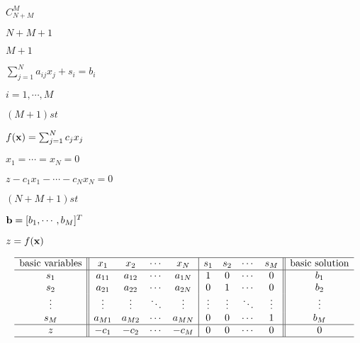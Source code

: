 \documentclass{article}
\def\lthtmlcheckvsize{\ifdim\ht\sizebox<\vsize 
  \ifdim\wd\sizebox<\hsize\expandafter\hfill\fi \expandafter\vfill
  \else\expandafter\vss\fi}%
\begin{document}
{\newpage\clearpage
{}%
$ C_{N+M}^M$%
\lthtmlindisplaymathZ
\lthtmlcheckvsize\clearpage}

{\newpage\clearpage
{}%
$ N+M+1$%
\lthtmlindisplaymathZ
\lthtmlcheckvsize\clearpage}

{\newpage\clearpage
{}%
$ M+1$%
\lthtmlindisplaymathZ
\lthtmlcheckvsize\clearpage}

{\newpage\clearpage
{}%
$ \sum_{j=1}^N a_{ij}x_j+s_i=b_i$%
\lthtmlindisplaymathZ
\lthtmlcheckvsize\clearpage}

{\newpage\clearpage
{}%
$ i=1,\cdots,M$%
\lthtmlindisplaymathZ
\lthtmlcheckvsize\clearpage}

{\newpage\clearpage
{}%
$ (M+1)st$%
\lthtmlindisplaymathZ
\lthtmlcheckvsize\clearpage}

{\newpage\clearpage
{}%
$ f({\bf x})=\sum_{j=1}^N c_jx_j$%
\lthtmlindisplaymathZ
\lthtmlcheckvsize\clearpage}

{\newpage\clearpage
{}%
$ x_1=\cdots=x_N=0$%
\lthtmlindisplaymathZ
\lthtmlcheckvsize\clearpage}

{\newpage\clearpage
{}%
$ z-c_1x_1-\cdots-c_Nx_N=0$%
\lthtmlindisplaymathZ
\lthtmlcheckvsize\clearpage}

{\newpage\clearpage
{}%
$ (N+M+1)st$%
\lthtmlindisplaymathZ
\lthtmlcheckvsize\clearpage}

{\newpage\clearpage
{}%
$ {\bf b}=[b_1,\cdots,b_M]^T$%
\lthtmlindisplaymathZ
\lthtmlcheckvsize\clearpage}

{\newpage\clearpage
{}%
$ z=f({\bf x})$%
\lthtmlindisplaymathZ
\lthtmlcheckvsize\clearpage}

{\newpage\clearpage
{}%
\begin{displaymath}\begin{array}{c||cccc|cccc||c}\hline
\mbox{basic variables} & x_1   & x_2   & \cdots &  x_N   & s_1 & s_2 & \cdots & s_M & \mbox{basic solution}   \\\hline
s_1   & a_{11} & a_{12} & \cdots & a_{1N}  & 1    &  0   & \cdots & 0    & b_1  \\
s_2   & a_{21} & a_{22} & \cdots & a_{2N}  & 0    &  1   & \cdots & 0    & b_2  \\
\vdots & \vdots & \vdots & \ddots & \vdots & \vdots & \vdots & \ddots & \vdots & \vdots\\
s_M  & a_{M1} & a_{M2} & \cdots & a_{MN}  & 0    &  0   & \cdots & 1    & b_M   \\\hline
z   & -c_1  & -c_2  & \cdots &  -c_M  & 0   &  0   & \cdots & 0  & 0\\\hline
\end{array}\end{displaymath}%
\lthtmldisplayZ
\lthtmlcheckvsize\clearpage}
\end{document}
